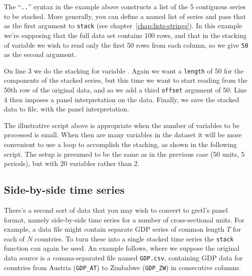 The ``\texttt{..}'' syntax in the example above constructs a list of
the 5 contiguous series to be stacked.  More generally, you can define
a named list of series and pass that as the first argument to
\texttt{stack} (see chapter~\ref{chap:lists-strings}). In this example
we're supposing that the full data set contains 100 rows, and that in
the stacking of variable  we wish to read only the first
50 rows from each column, so we give \texttt{50} as the second
argument.

On line 3 we do the stacking for variable .  Again we want
a \texttt{length} of 50 for the components of the stacked series, but
this time we want to start reading from the 50th row of the original
data, and so we add a third \texttt{offset} argument of 50.  Line 4
then imposes a panel interpretation on the data. Finally, we save the
stacked data to file, with the panel interpretation.

The illustrative script above is appropriate when the number of
variables to be processed is small.  When then are many variables in
the dataset it will be more convenient to use a loop to accomplish the
stacking, as shown in the following script.  The setup is presumed to
be the same as in the previous case (50 units, 5 periods), but with 20
variables rather than 2.


\subsection{Side-by-side time series}

There's a second sort of data that you may wish to convert to gretl's
panel format, namely side-by-side time series for a number of
cross-sectional units. For example, a data file might contain separate
GDP series of common length $T$ for each of $N$ countries. To turn
these into a single stacked time series the \texttt{stack} function
can again be used. An example follows, where we suppose the original
data source is a comma-separated file named \texttt{GDP.csv},
containing GDP data for countries from Austria (\texttt{GDP\_AT}) to
Zimbabwe (\texttt{GDP\_ZW}) in consecutive columns.


